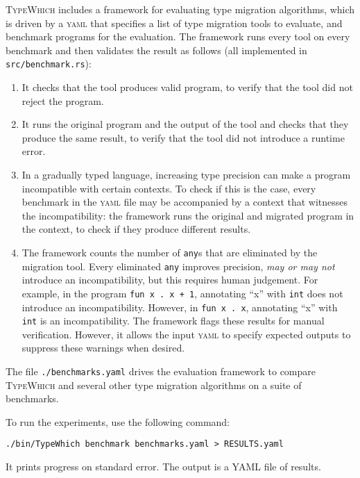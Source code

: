 \documentclass{article}
\newcommand{\system}{\textsc{TypeWhich}\xspace}
\begin{document}
\system includes a framework for evaluating type migration algorithms, which is
driven by a \textsc{yaml} that specifies a list of type migration tools to
evaluate, and benchmark programs for the evaluation. The framework runs every
tool on every benchmark and then validates the result as follows
(all implemented in \texttt{src/benchmark.rs}):
\begin{enumerate}

\item It checks that the tool produces valid program, to verify that the tool
did not reject the program.

\item It runs the original program and the output of the tool and checks that
they produce the same result, to verify that the tool did not introduce a
runtime error.

\item In a gradually typed language, increasing type precision can make a
program incompatible with certain contexts. To check if this is the case, every
benchmark in the \textsc{yaml} file may be accompanied by a context that
witnesses the incompatibility: the framework runs the original and migrated
program in the context, to check if they produce different results.

\item The framework counts the number of \texttt{any}s that are eliminated
by the migration tool. Every eliminated \texttt{any} improves precision, 
\emph{may or may not} introduce an incompatibility, but this requires human
judgement. For example, in the
program \verb|fun x . x + 1|, annotating ``x'' with \texttt{int} does not
introduce an incompatibility. However, in \verb|fun x . x|, annotating ``x''
with \texttt{int} is an incompatibility. The framework flags these results
for manual verification. However, it allows the input \textsc{yaml} to specify
expected outputs to suppress these warnings when desired.

\end{enumerate}

The file \texttt{./benchmarks.yaml} drives the evaluation framework to
compare \system and several other type migration algorithms on a suite of
benchmarks.

To run the experiments, use the following command:
\begin{verbatim}
./bin/TypeWhich benchmark benchmarks.yaml > RESULTS.yaml
\end{verbatim}
It prints progress on standard error. The output is a YAML file of results.
\end{document}
